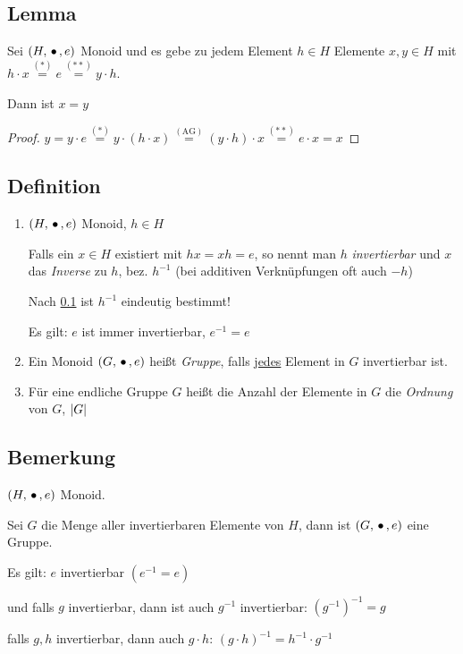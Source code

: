  \subsection{Lemma} \label{neutElemEindeutig}
 
 Sei $(H, \,{\bullet}\,, e)$ Monoid und es gebe zu jedem Element $h \in H$ Elemente $x, y \in H$ mit ${h \cdot x \stackrel{(*)}{=} e \stackrel{(**)}{=} y \cdot h}$.
 
 Dann ist $x = y$
 
 \begin{proof}
 	$y = y \cdot e \stackrel{(*)}{=} y \cdot (h \cdot x) \stackrel{(\text{AG})}{=} (y \cdot h) \cdot x \stackrel{(**)}{=} e \cdot x = x$
 \end{proof}
 
 \subsection{Definition}
 
 {\renewcommand{\labelenumi}{(\roman{enumi})}
 \begin{enumerate}
 
 	\item
 	$(H, \,{\bullet}\,, e)$ Monoid, $h \in H$
 	
 	Falls ein $x \in H$ existiert mit $hx = xh = e$, so nennt man $h$ \emph{invertierbar} und $x$ das \emph{Inverse} zu $h$, bez. $h^{-1}$
 	(bei additiven Verknüpfungen oft auch $-h$)
 	
 	Nach \ref{neutElemEindeutig} ist $h^{-1}$ eindeutig bestimmt!
 	
 	Es gilt: $e$ ist immer invertierbar, $e^{-1} = e$
 	
 	\item
 	Ein Monoid $(G, \,{\bullet}\,, e)$ heißt \emph{Gruppe}, falls \underline{jedes} Element in $G$ invertierbar ist.
 	
 	\item
 	Für eine endliche Gruppe $G$ heißt die Anzahl der Elemente in $G$ die \emph{Ordnung} von $G$, $\left|G\right|$
 	
 \end{enumerate}
 }
 
 
 \subsection{Bemerkung}
 
 $(H, \,{\bullet}\,, e)$ Monoid.
 
 Sei $G$ die Menge aller invertierbaren Elemente von $H$, dann ist $(G, \,{\bullet}\,, e)$ eine Gruppe.
 
 Es gilt: $e$ invertierbar $(e^{-1} = e)$
 
 und falls $g$ invertierbar, dann ist auch $g^{-1}$ invertierbar: $(g^{-1})^{-1} = g$
 
 falls $g, h$ invertierbar, dann auch $g \cdot h$: \quad
 $(g \cdot h)^{-1} = h^{-1} \cdot g^{-1} $
 
 
 
 
 
 
 